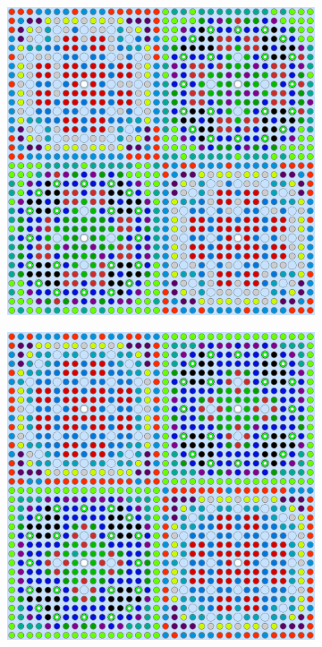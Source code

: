 \begin{figure}[h!]
\begin{subfigure}{0.48\textwidth}
  \caption{}
  \label{fig:chap10-assm-2x2-combined-4}
\end{subfigure}
\begin{subfigure}{0.48\textwidth}
  \centering
  \includegraphics[width=0.9\linewidth]{figures/unsupervised/geometries/with-features/8-clusters/pinch/2x2}
  \caption{}
  \label{fig:chap10-assm-2x2-pinch-8}
\end{subfigure}%
\begin{subfigure}{0.48\textwidth}
  \centering
  \includegraphics[width=0.9\linewidth]{figures/unsupervised/geometries/with-features/8-clusters/combined/2x2}

\end{subfigure}
\end{figure}
